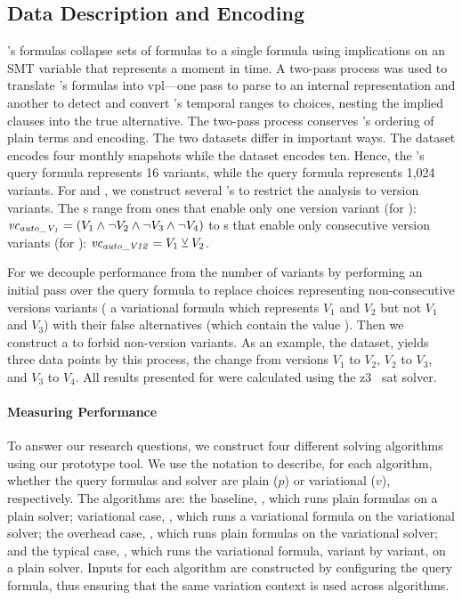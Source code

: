 \subsection{Data Description and Encoding}%
\label{section:exper-meth:description}
%
%
\nieke{}'s formulas collapse sets of \pl{} formulas to a single formula using
implications on an SMT variable that represents a moment in time. A two-pass
process was used to translate \nieke{}'s formulas into \ac{vpl}---one pass to
parse to an internal representation and another to detect and convert \nieke{}'s
temporal ranges to choices, nesting the implied clauses into the true
alternative. The two-pass process conserves \nieke{}'s ordering of plain terms
and encoding. The two datasets differ in important ways. The \auto{} dataset
encodes four monthly snapshots while the \fin{} dataset encodes ten. Hence, the
\auto{}'s query formula represents 16 variants, while the \fin{} query formula
represents 1,024 variants. For  and , we construct several
\vc{}'s to restrict the analysis to version variants. The \vc{}s range from ones
that enable only one version variant (for ): $\mathit{vc_{\mathit{auto\_V_{1}}}}
= (V_{1} \wedge \neg V_{2} \wedge \neg V_{3} \wedge \neg V_{4})$ to \vc{}s that
enable only consecutive version variants (for ):
$\mathit{vc_{\mathit{auto\_V12}}} = V_{1} \veebar V_{2}$.

For  we decouple performance from the number of variants by performing
an initial pass over the query formula to replace choices representing
non-consecutive versions variants (\eg{} a variational formula which represents
$V_{1}$ and $V_{2}$ but not $V_{1}$ and $V_{3}$) with their false alternatives
(which contain the value \tru{}). Then we construct a \vc{} to forbid
non-version variants. As an example, the \auto{} dataset, yields three data
points by this process, the change from versions $V_{1}$ to $V_{2}$, $V_{2}$ to
$V_{3}$, and $V_{3}$ to $V_{4}$. All results presented for  were
  calculated using the z3~{\citep{10.1007/978-3-540-78800-3_24}} \ac{sat}
  solver.

\paragraph{Measuring Performance}%
\label{section:exper-meth:perf}
%
To answer our research questions, we construct four different solving
algorithms using our prototype tool. We use the notation
 to describe, for each algorithm, whether the query
formulas and solver are plain ($p$) or variational ($v$), respectively.
%
The algorithms are: the baseline, \pTop{}, which runs plain formulas on a plain
solver; variational case, \vTov{}, which runs a variational formula on the
variational solver; the overhead case, \pTov{}, which runs plain formulas on the
variational solver; and the typical case, \vTop{}, which runs the variational
formula, variant by variant, on a plain solver. Inputs for each algorithm are
constructed by configuring the query formula, thus ensuring that the same
variation context is used across algorithms.

